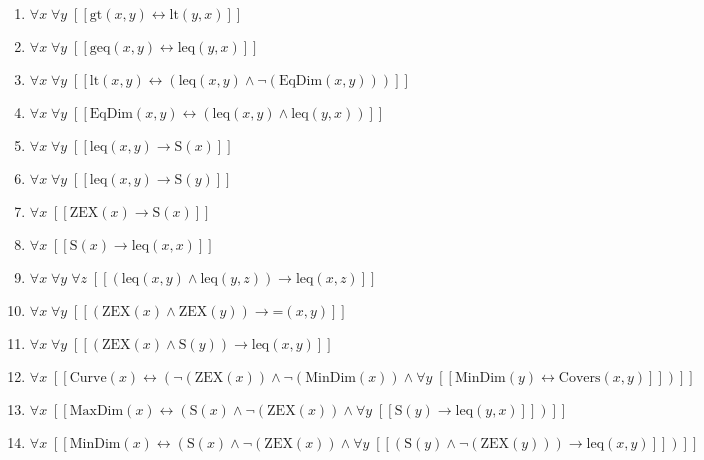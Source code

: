 \documentclass{article}
\begin{document}
\begin{enumerate}
\item $\forall x\; \forall y\;  \left[ \left[ \textrm{gt}(x,y) \leftrightarrow \textrm{lt}(y,x) \right] \right]$
\item $\forall x\; \forall y\;  \left[ \left[ \textrm{geq}(x,y) \leftrightarrow \textrm{leq}(y,x) \right] \right]$
\item $\forall x\; \forall y\;  \left[ \left[ \textrm{lt}(x,y) \leftrightarrow \left(\textrm{leq}(x,y) \land \neg \left(\textrm{EqDim}(x,y)\right)\right) \right] \right]$
\item $\forall x\; \forall y\;  \left[ \left[ \textrm{EqDim}(x,y) \leftrightarrow \left(\textrm{leq}(x,y) \land \textrm{leq}(y,x)\right) \right] \right]$
\item $\forall x\; \forall y\;  \left[ \left[ \textrm{leq}(x,y) \rightarrow \textrm{S}(x) \right] \right]$
\item $\forall x\; \forall y\;  \left[ \left[ \textrm{leq}(x,y) \rightarrow \textrm{S}(y) \right] \right]$
\item $\forall x\;  \left[ \left[ \textrm{ZEX}(x) \rightarrow \textrm{S}(x) \right] \right]$
\item $\forall x\;  \left[ \left[ \textrm{S}(x) \rightarrow \textrm{leq}(x,x) \right] \right]$
\item $\forall x\; \forall y\; \forall z\;  \left[ \left[ \left(\textrm{leq}(x,y) \land \textrm{leq}(y,z)\right) \rightarrow \textrm{leq}(x,z) \right] \right]$
\item $\forall x\; \forall y\;  \left[ \left[ \left(\textrm{ZEX}(x) \land \textrm{ZEX}(y)\right) \rightarrow \textrm{=}(x,y) \right] \right]$
\item $\forall x\; \forall y\;  \left[ \left[ \left(\textrm{ZEX}(x) \land \textrm{S}(y)\right) \rightarrow \textrm{leq}(x,y) \right] \right]$
\item $\forall x\;  \left[ \left[ \textrm{Curve}(x) \leftrightarrow \left(\neg \left(\textrm{ZEX}(x)\right) \land \neg \left(\textrm{MinDim}(x)\right) \land \forall y\;  \left[ \left[ \textrm{MinDim}(y) \leftrightarrow \textrm{Covers}(x,y) \right] \right]\right) \right] \right]$
\item $\forall x\;  \left[ \left[ \textrm{MaxDim}(x) \leftrightarrow \left(\textrm{S}(x) \land \neg \left(\textrm{ZEX}(x)\right) \land \forall y\;  \left[ \left[ \textrm{S}(y) \rightarrow \textrm{leq}(y,x) \right] \right]\right) \right] \right]$
\item $\forall x\;  \left[ \left[ \textrm{MinDim}(x) \leftrightarrow \left(\textrm{S}(x) \land \neg \left(\textrm{ZEX}(x)\right) \land \forall y\;  \left[ \left[ \left(\textrm{S}(y) \land \neg \left(\textrm{ZEX}(y)\right)\right) \rightarrow \textrm{leq}(x,y) \right] \right]\right) \right] \right]$

\end{enumerate}
\end{document}
